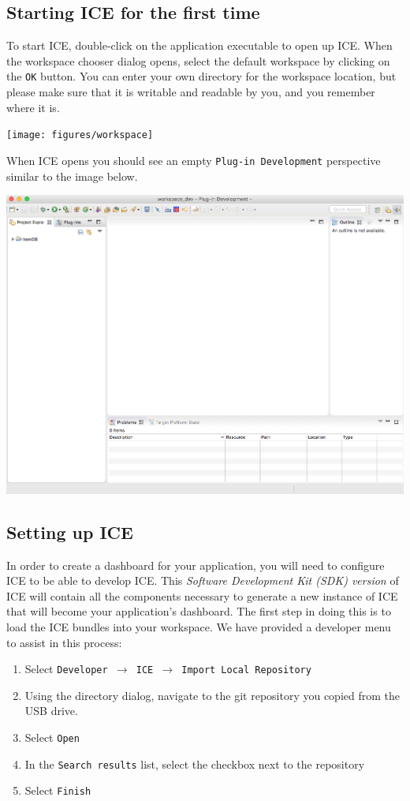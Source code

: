 \subsection{Starting ICE for the first time}
To start ICE, double-click on the application executable to open up ICE. When the workspace chooser
dialog opens, select the default workspace by clicking on the \texttt{OK}
button.
You can enter your own directory for the workspace location, but please make sure that it is writable and readable by you, and you remember where it is.
\begin{center} \texttt{[image: figures/workspace]}
\end{center}
When ICE opens you should see an empty \texttt{Plug-in Development} perspective
similar to the image below.
\begin{center} \includegraphics[width=\textwidth]{figures/expectedICE}
\end{center} 

\subsection{Setting up ICE}
In order to create a dashboard for your application, you will need to configure ICE to
be able to develop ICE. This \textit{Software Development Kit (SDK) version} of
ICE will contain all the components necessary to generate a new instance of ICE that will become your application's dashboard. 
The first step in doing this is to load the ICE bundles into
your workspace. We have provided a developer menu to assist in this process:

\begin{enumerate}
\item Select \texttt{Developer $\rightarrow$ ICE $\rightarrow$
Import Local Repository}
\item Using the directory dialog, navigate to the git repository you copied
from the USB drive.
\item Select \texttt{Open}
\item In the \texttt{Search results} list, select the checkbox next to the
repository
\item Select \texttt{Finish}
\end{enumerate}

